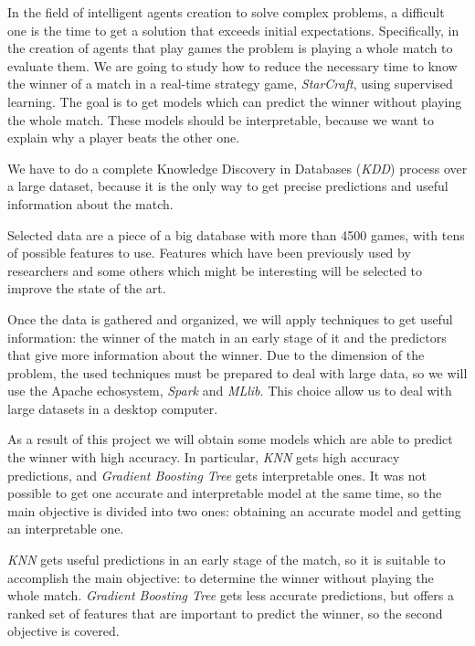 In the field of intelligent agents creation to solve complex problems, a
difficult one is the time to get a solution that exceeds initial expectations.
Specifically, in the creation of agents that play games the problem is
playing a whole match to evaluate them. We are going to study how to reduce
the necessary time to know the winner of a match in a real-time strategy game,
\emph{StarCraft}, using supervised learning. The goal is to get models which
can predict the winner without playing the whole match. These models should be
interpretable, because we want to explain why a player beats the other one.

We have to do a complete Knowledge Discovery in Databases (\emph{KDD}) process
over a large dataset, because it is the only way to get precise predictions and
useful information about the match.

Selected data are a piece of a big database with more than 4500 games, with
tens of possible features to use. Features which have been previously used by
researchers and some others which might be interesting will be selected to
improve the state of the art.

Once the data is gathered and organized, we will apply techniques to get
useful information: the winner of the match in an early stage of it and the
predictors that give more information about the winner. Due to the dimension
of the problem, the used techniques must be prepared to deal with large data,
so we will use the Apache echosystem, \emph{Spark} and \emph{MLlib}. This
choice allow us to deal with large datasets in a desktop computer.

As a result of this project we will obtain some models which are able to
predict the winner with high accuracy. In particular, \emph{KNN} gets high
accuracy predictions, and \emph{Gradient Boosting Tree} gets interpretable ones.
It was not possible to get one accurate and interpretable model at the same time,
so the main objective is divided into two ones: obtaining an accurate model and
getting an interpretable one.

\emph{KNN} gets useful predictions in an early stage of the match, so it is
suitable to accomplish the main objective: to determine the winner
without playing the whole match. \emph{Gradient Boosting Tree} gets less
accurate predictions, but offers a ranked set of features that are important
to predict the winner, so the second objective is covered.
